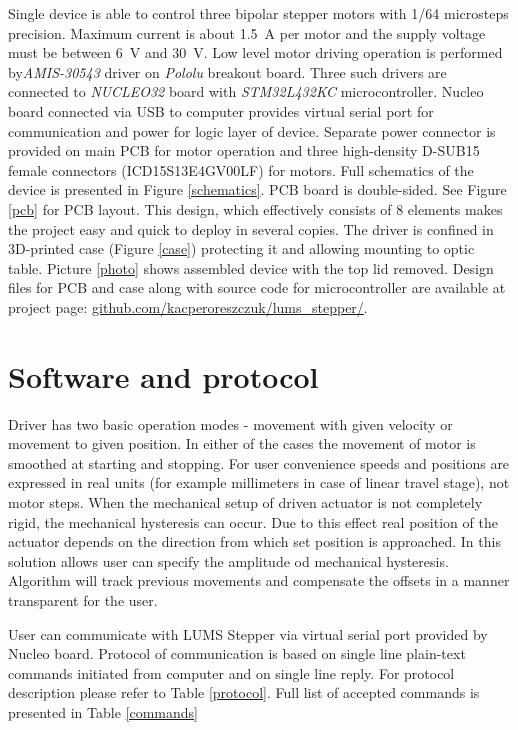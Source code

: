 \documentclass[10pt,article]{article}
\begin{document}
Single device is able to control three bipolar stepper motors with 1/64 microsteps precision. Maximum current is about \SI{1.5}{A} per motor and the supply voltage must be between \SI{6}{V} and \SI{30}{V}.
Low level motor driving operation  is performed by\textit{AMIS-30543} driver on \textit{Pololu} breakout board. Three such drivers are connected to \textit{NUCLEO32}  board with \textit{STM32L432KC} microcontroller. Nucleo board connected via USB to computer provides virtual serial port for communication and power for logic layer of device. Separate power connector is provided on main PCB for motor operation and three high-density D-SUB15 female connectors (ICD15S13E4GV00LF) for motors. Full schematics of the device is presented in Figure \ref{schematics}. PCB board is double-sided. See Figure \ref{pcb} for PCB layout. This design, which effectively consists of 8 elements makes the project easy and quick to deploy in several copies. The driver is confined in 3D-printed case (Figure \ref{case}) protecting it and allowing mounting to optic table. Picture \ref{photo} shows assembled device with the top lid removed. Design files for PCB and case along with source code for microcontroller are available at project page: \url{github.com/kacperoreszczuk/lums_stepper/}. 

\section{Software and protocol}

Driver has two basic operation modes - movement with given velocity or movement to given position. In either of the cases the movement of motor is smoothed at starting and stopping. For user convenience speeds and positions are expressed in real units (for example millimeters in case of linear travel stage), not motor steps. When the mechanical setup of driven actuator is not completely rigid, the mechanical hysteresis can occur. Due to this effect real position of the  actuator depends on the direction from which set position is approached. In this solution allows user can specify the amplitude od mechanical hysteresis. Algorithm will track previous movements and compensate the offsets in a manner transparent for the user. 

User can communicate with LUMS Stepper via virtual serial port provided by Nucleo board. Protocol of communication is based on single line plain-text commands initiated from computer and on single line reply. For protocol description please refer to Table \ref{protocol}. Full list of accepted commands is presented in Table \ref{commands}
\end{document}
